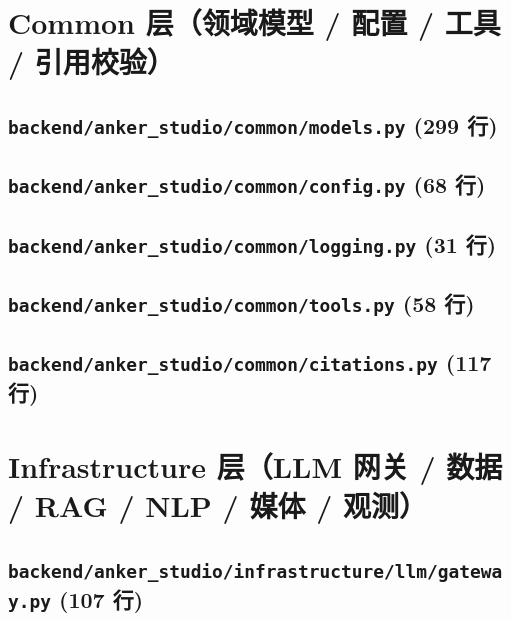 
\section{Common 层（领域模型 / 配置 / 工具 / 引用校验）}
\subsection*{\texttt{backend/anker\_studio/common/models.py} \hfill \normalfont\small (299 行)}


\subsection*{\texttt{backend/anker\_studio/common/config.py} \hfill \normalfont\small (68 行)}


\subsection*{\texttt{backend/anker\_studio/common/logging.py} \hfill \normalfont\small (31 行)}


\subsection*{\texttt{backend/anker\_studio/common/tools.py} \hfill \normalfont\small (58 行)}


\subsection*{\texttt{backend/anker\_studio/common/citations.py} \hfill \normalfont\small (117 行)}


\section{Infrastructure 层（LLM 网关 / 数据 / RAG / NLP / 媒体 / 观测）}
\subsection*{\texttt{backend/anker\_studio/infrastructure/llm/gateway.py} \hfill \normalfont\small (107 行)}


